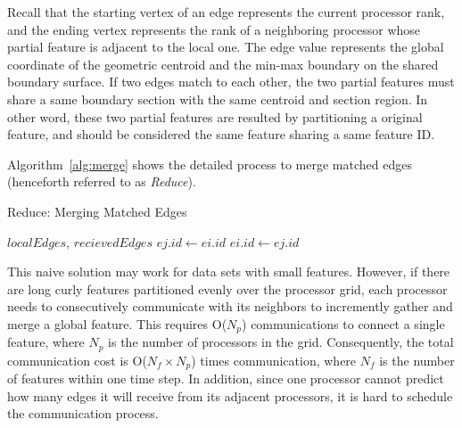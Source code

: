 \documentclass[10pt, conference, compsocconf]{IEEEtran}
\begin{document}
Recall that the starting vertex of an edge represents the current processor rank, and the ending vertex represents the rank of a neighboring processor whose partial feature is adjacent to the local one. The edge value represents the global coordinate of the geometric centroid and the min-max boundary on the shared boundary surface. If two edges match to each other, the two partial features must share a same boundary section with the same centroid and section region. In other word, these two partial features are resulted by partitioning a original feature, and should be considered the same feature sharing a same feature ID.

Algorithm~\ref{alg:merge} shows the detailed process to merge matched edges (henceforth referred to as \emph{Reduce}).
\begin{algorithm}
\caption{Reduce: Merging Matched Edges}
\label{alg:merge}
\begin{algorithmic}[1]
\REQUIRE $localEdges$, $recievedEdges$
				\STATE $ej.id \leftarrow ei.id$
			\ELSE
				\STATE $ei.id \leftarrow ej.id$
			\ENDIF
		\ENDIF
	\ENDFOR	
\ENDFOR	
\end{algorithmic}
\end{algorithm}

This naive solution may work for data sets with small features. However, if there are long curly features partitioned evenly over the processor grid, each processor needs to consecutively communicate with its neighbors to incremently gather and merge a global feature. This requires O(${N_p}$) communications to connect a single feature, where ${N_p}$ is the number of processors in the grid. Consequently, the total communication cost is O(${N_f \times N_p}$) times communication, where ${N_f}$ is the number of features within one time step. In addition, since one processor cannot predict how many edges it will receive from its adjacent processors, it is hard to schedule the communication process.
\end{document}

